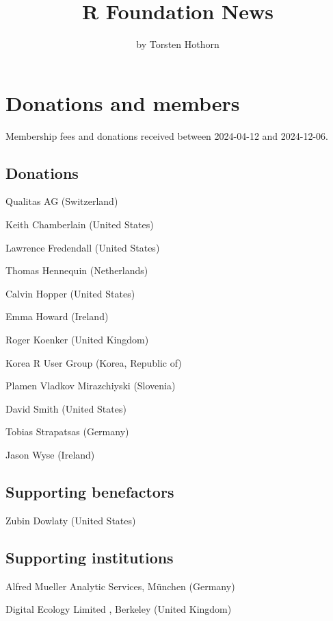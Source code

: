 \title{R Foundation News}


\author{by Torsten Hothorn}

\maketitle


\section{Donations and members}\label{donations-and-members}

Membership fees and donations received between
2024-04-12 and 2024-12-06.

\subsection{Donations}\label{donations}

Qualitas AG (Switzerland)

Keith Chamberlain (United States)

Lawrence Fredendall (United States)

Thomas Hennequin (Netherlands)

Calvin Hopper (United States)

Emma Howard (Ireland)

Roger Koenker (United Kingdom)

Korea R User Group (Korea, Republic of)

Plamen Vladkov Mirazchiyski (Slovenia)

David Smith (United States)

Tobias Strapatsas (Germany)

Jason Wyse (Ireland)

\subsection{Supporting benefactors}\label{supporting-benefactors}

Zubin Dowlaty (United States)

\subsection{Supporting institutions}\label{supporting-institutions}

Alfred Mueller Analytic Services, München (Germany)

Digital Ecology Limited , Berkeley (United Kingdom)

